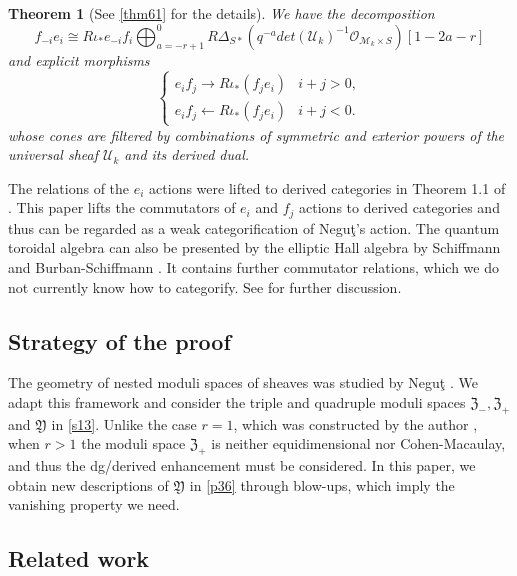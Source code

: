 \documentclass{amsart}
\numberwithin{equation}{section}
\newcommand\mc{\mathcal}
\newcommand\mf{\mathfrak}
\newtheorem{theorem}{Theorem}[section]
\theoremstyle{definition}
\theoremstyle{remark}
\begin{document}
\begin{theorem}[See \cref{thm61} for the details]
  \label{thm11}
  We have the decomposition
  $$f_{-i}e_{i}\cong R\iota_{*}e_{-i}f_{i}\bigoplus_{a=-r+1}^{0} R\Delta_{S*}(q^{-a}det(\mc{U}_{k})^{-1}\mc{O}_{\mc{M}_{k}\times S})[1-2a-r]$$
and explicit morphisms
  \begin{equation*}
    \begin{cases}
      e_if_j\to R\iota_{*}(f_{j}e_{i}) & i+j>0, \\
      e_if_j\xleftarrow{} R\iota_{*}(f_{j}e_{i}) & i+j<0.
    \end{cases}
  \end{equation*}
whose cones are filtered by combinations of symmetric and exterior powers of the universal sheaf $\mc{U}_{k}$ and its derived dual.
  \end{theorem}


The relations of the $e_{i}$ actions were lifted to derived categories in Theorem 1.1 of \cite{neguct2018hecke}. This paper lifts the commutators of $e_{i}$ and $f_{j}$ actions to derived categories and thus can be regarded as a weak categorification of Negu\c{t}'s action.
The quantum toroidal algebra can also be presented by the elliptic Hall algebra by Schiffmann \cite{MR2886289} and Burban-Schiffmann \cite{MR2922373}. It contains further commutator relations, which we do not currently know how to categorify. See \cite{neguct2018hecke} for further discussion.
 



\subsection{Strategy of the proof}
The geometry of nested moduli spaces of sheaves was studied by Negu\c{t} \cite{negut2017shuffle,neguct2017w,neguct2017agt,neguct2018hecke}. We adapt this framework and consider the triple and quadruple moduli spaces $\mf{Z}_{-},\mf{Z}_{+}$ and $\mf{Y}$ in \cref{s13}. Unlike the case $r=1$, which was constructed by the author \cite{zhao2020categorical}, when $r>1$ the moduli space $\mf{Z}_{+}$ is neither equidimensional nor Cohen-Macaulay, and thus the dg/derived enhancement must be considered. In this paper, we obtain new descriptions of $\mf{Y}$ in \cref{p36} through blow-ups, which imply the vanishing property we need.
 






\subsection{Related work} 
\end{document}
